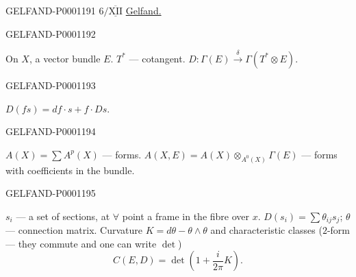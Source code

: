 \begin{GelfandAdjacentEvidence}{GELFAND-P000119}{1}
$6/\underline{\overline{\mathrm{XII}}}$ \underline{Gelfand.}
\end{GelfandAdjacentEvidence}
\begin{GelfandAdjacentEvidence}{GELFAND-P000119}{2}

On $X$, a vector bundle $E$. $T^*$ — cotangent.
$D:\Gamma(E)\stackrel{\delta}{\longrightarrow}\Gamma(T^*\otimes E)$.
\end{GelfandAdjacentEvidence}
\begin{GelfandAdjacentEvidence}{GELFAND-P000119}{3}

$D(fs)=df\cdot s+f\cdot Ds$.
\end{GelfandAdjacentEvidence}
\begin{GelfandAdjacentEvidence}{GELFAND-P000119}{4}

$A(X)=\sum A^p(X)$ — forms.
$A(X,E)=A(X)\otimes_{A^0(X)}\Gamma(E)$ — forms with coefficients in the bundle.
\end{GelfandAdjacentEvidence}
\begin{GelfandAdjacentEvidence}{GELFAND-P000119}{5}

$s_i$ — a set of sections, at $\forall$ point a frame in the fibre over $x$.
$D(s_i)=\sum\theta_{ij}s_j$; $\theta$ — connection matrix.
Curvature $K=d\theta-\theta\wedge\theta$ and characteristic classes
($2$-form — they commute and one can write $\det$)
\begin{equation*}C(E,D)=\det\left(1+\frac{i}{2\pi}K\right).\end{equation*}
\end{GelfandAdjacentEvidence}

